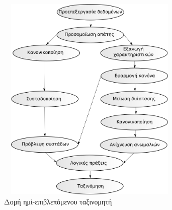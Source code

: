 \begin{figure}
\centering
 \includegraphics[width=90mm, height=100mm]{../../plots/systems/semi_supervised.png}
 \caption{Δομή ημί-επιβλεπόμενου ταξινομητή}
\label{fig:semisupervisedsystem}
 \end{figure}

